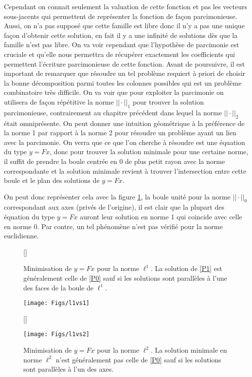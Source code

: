Cependant on connait seulement la valuation de cette fonction et pas les vecteurs sous-jacents qui permettent de représenter la fonction de façon parcimonieuse.
Aussi, on n'a pas supposé que cette famille est libre donc il n'y a pas une unique façon d'obtenir cette solution, en fait il y a une infinité de solutions dès que la famille n'est pas libre.
On va voir cependant que l'hypothèse de parcimonie est cruciale et qu'elle nous permettra de récupérer exactement les coefficients qui permettent l'écriture parcimonieuse de cette fonction.
\newline
Avant de poursuivre, il est important de remarquer que résoudre un tel problème requiert à priori de choisir la bonne décomposition parmi toutes les colonnes possibles qui est un problème combinatoire très difficile.
On va voir que pour exploiter la parcimonie on utilisera de façon répétitive la norme $||\cdot||_1$ pour trouver la solution parcimonieuse, contrairement au chapitre précédent dans lequel la norme $||\cdot||_2$ était omniprésente.
On peut donner une intuition géométrique à la préférence de la norme 1 par rapport à la norme 2 pour résoudre un problème ayant un lien avec la parcimonie.
On verra que ce que l'on cherche à résoudre est une équation du type $y=Fx$, donc pour trouver la solution minimale pour une certaine norme, il suffit de prendre la boule centrée en 0 de plus petit rayon avec la norme correspondante et la solution minimale revient à trouver l'intersection entre cette boule et le plan des solutions de $y=Fx$.


On peut donc représenter cela avec la figure \ref{fig:compball}, la boule unité pour la norme $||\cdot||_0$ correspondant aux axes (privés de l'origine), il est clair que la plupart des équation du type $y=Fx$ auront leur solution en norme 1 qui coincide avec celle en norme 0.
Par contre, un tel phénomène n'est pas vérifié pour la norme euclidienne.
	\begin{figure}[h]
		[\FBwidth]
		{\caption{Minimisation de $y=Fx$ pour la norme $\ell^1$. La solution de \ref{P1} est généralement celle de \ref{P0} sauf si les solutions sont parallèles à l'une des faces de la boule de $\ell^1$.}\label{fig:compball}}
		{\texttt{[image: Figs/l1vs1]}}

		[\FBwidth]
		{\caption{Minimisation de $y=Fx$ pour la norme $\ell^2$. La solution minimale en norme $\ell^2$ n'est généralement pas celle de \ref{P0} sauf si les solutions sont parallèles à l'un des axes.}}
		{\texttt{[image: Figs/l1vs2]}}
	
	\end{figure}



